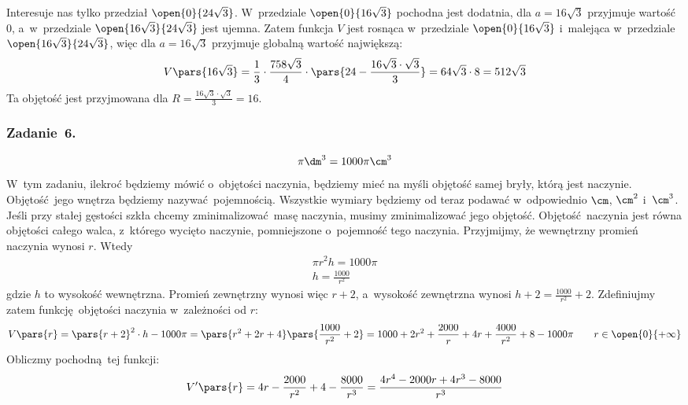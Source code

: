 Interesuje nas tylko przedział \(\open{0}{24\sqrt{3}}\). W~przedziale \(\open{0}{16\sqrt{3}}\) pochodna jest dodatnia, dla \(a = 16\sqrt{3}\) przyjmuje wartość \(0\), a~w~przedziale \(\open{16\sqrt{3}}{24\sqrt{3}}\) jest ujemna. Zatem funkcja \(V\) jest rosnąca w~przedziale \(\open{0}{16\sqrt{3}}\) i~malejąca w~przedziale \(\open{16\sqrt{3}}{24\sqrt{3}}\), więc dla \(a = 16\sqrt{3}\) przyjmuje globalną wartość największą:
\begin{equation*}
    V\pars{16\sqrt{3}}
        = \frac{1}{3} \cdot \frac{758\sqrt{3}}{4} \cdot \pars{24 - \frac{16\sqrt{3} \cdot \sqrt{3}}{3}}
        = 64\sqrt{3} \cdot 8
        = 512\sqrt{3}
\end{equation*}
Ta objętość jest przyjmowana dla \(R = \frac{16\sqrt{3} \cdot \sqrt{3}}{3} = 16\).
\subsubsection*{Zadanie~6.}
\begin{equation*}
    \pi\dm^3 = 1000\pi\cm^3
\end{equation*}
W~tym zadaniu, ilekroć będziemy mówić o~objętości naczynia, będziemy mieć na myśli objętość samej bryły, którą jest naczynie. Objętość jego wnętrza będziemy nazywać pojemnością. Wszystkie wymiary będziemy od teraz podawać w~odpowiednio \(\cm\), \(\cm^2\) i~\(\cm^3\). Jeśli przy stałej gęstości szkła chcemy zminimalizować masę naczynia, musimy zminimalizować jego objętość. Objętość naczynia jest równa objętości całego walca, z~którego wycięto naczynie, pomniejszone o~pojemność tego naczynia. Przyjmijmy, że wewnętrzny promień naczynia wynosi \(r\). Wtedy
\begin{gather*}
    \pi r^2h = 1000\pi\\
    h = \frac{1000}{r^2}
\end{gather*}
gdzie \(h\) to wysokość wewnętrzna. Promień zewnętrzny wynosi więc \(r + 2\), a~wysokość zewnętrzna wynosi \(h + 2 = \frac{1000}{r^2} + 2\). Zdefiniujmy zatem funkcję objętości naczynia w~zależności od \(r\):
\begin{equation*}
    V\pars{r}
        = \pars{r + 2}^2 \cdot h - 1000\pi
        = \pars{r^2 + 2r + 4}\pars{\frac{1000}{r^2} + 2}
        = 1000 + 2r^2 + \frac{2000}{r} + 4r + \frac{4000}{r^2} + 8 - 1000\pi \qquad r \in \open{0}{+\infty}
\end{equation*}
Obliczmy pochodną tej funkcji:
\begin{equation*}
    V'\pars{r}
        = 4r - \frac{2000}{r^2} + 4 - \frac{8000}{r^3}
        = \frac{4r^4 - 2000r + 4r^3 - 8000}{r^3}
\end{equation*}
